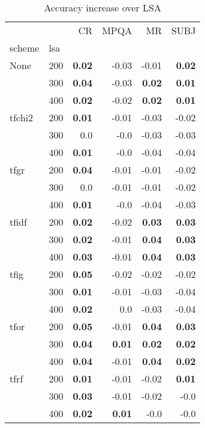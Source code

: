 
\begin{table}[H]
\begin{center}

\begin{tabular}{ll|rrrr}
\toprule
   &   &   CR &  MPQA &   MR &  SUBJ \\
scheme & lsa &        &        &        &        \\
\midrule
None & 200 & \textbf{0.02} &     -0.03 &     -0.01 & \textbf{0.02} \\
   & 300 & \textbf{0.04} &     -0.03 & \textbf{0.02} & \textbf{0.01} \\
   & 400 & \textbf{0.02} &     -0.02 & \textbf{0.02} & \textbf{0.01} \\
tfchi2 & 200 & \textbf{0.01} &     -0.01 &     -0.03 &     -0.02 \\
   & 300 &      0.0 &     -0.0 &     -0.03 &     -0.03 \\
   & 400 & \textbf{0.01} &     -0.0 &     -0.04 &     -0.04 \\
tfgr & 200 & \textbf{0.04} &     -0.01 &     -0.01 &     -0.02 \\
   & 300 &      0.0 &     -0.01 &     -0.01 &     -0.02 \\
   & 400 & \textbf{0.01} &     -0.0 &     -0.04 &     -0.03 \\
tfidf & 200 & \textbf{0.02} &     -0.02 & \textbf{0.03} & \textbf{0.03} \\
   & 300 & \textbf{0.02} &     -0.01 & \textbf{0.04} & \textbf{0.03} \\
   & 400 & \textbf{0.03} &     -0.01 & \textbf{0.04} & \textbf{0.03} \\
tfig & 200 & \textbf{0.05} &     -0.02 &     -0.02 &     -0.02 \\
   & 300 & \textbf{0.01} &     -0.01 &     -0.03 &     -0.04 \\
   & 400 & \textbf{0.02} &      0.0 &     -0.03 &     -0.04 \\
tfor & 200 & \textbf{0.05} &     -0.01 & \textbf{0.04} & \textbf{0.03} \\
   & 300 & \textbf{0.04} & \textbf{0.01} & \textbf{0.02} & \textbf{0.02} \\
   & 400 & \textbf{0.04} &     -0.01 & \textbf{0.04} & \textbf{0.02} \\
tfrf & 200 & \textbf{0.01} &     -0.01 &     -0.02 & \textbf{0.01} \\
   & 300 & \textbf{0.03} &     -0.01 &     -0.02 &     -0.0 \\
   & 400 & \textbf{0.02} & \textbf{0.01} &     -0.0 &     -0.0 \\
\bottomrule
\end{tabular}

\caption[Accuracy increase over LSA]{Accuracy increase over LSA}
\label{tab:batch:results}
\end{center}
\end{table}






